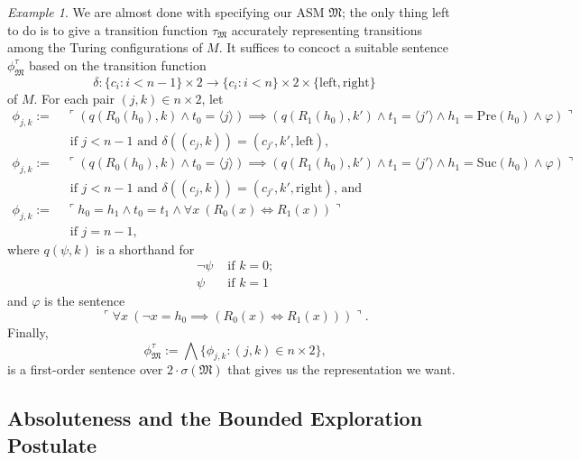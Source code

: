 \documentclass[12pt, twoside]{memoir}
\numberwithin{equation}{section}
\theoremstyle{definition}
\theoremstyle{remark}
\newtheorem{ex}[thm]{Example}
\theoremstyle{definition}
\theoremstyle{definition}
\theoremstyle{definition}
\theoremstyle{remark}
\begin{document}
\begin{ex}
We are almost done with specifying our ASM $\mathfrak{M}$; the only thing left to do is to give a transition function $\tau_{\mathfrak{M}}$ accurately representing transitions among the Turing configurations of $M$. It suffices to concoct a suitable sentence $\phi^{\tau}_{\mathfrak{M}}$ based on the transition function $$\delta : \{c_i : i < n-1\} \times 2 \longrightarrow \{c_i : i < n\} \times 2 \times \{\mathrm{left}, \mathrm{right}\}$$ of $M$. For each pair $(j, k) \in n \times 2$, let
\begin{align*}
    \phi_{j,k} := \ & \ulcorner (q(R_0(h_0), k) \wedge t_0 \! = \! \langle j \rangle) \!\! \implies \!\! (q(R_1(h_0), k') \wedge t_1 \! = \! \langle j' \rangle \wedge h_1 \! = \mathrm{Pre}(h_0) \wedge \varphi) \urcorner \\ 
    & \text{ if } j < n-1 \text{ and } \delta((c_j, k)) = (c_{j'}, k', \mathrm{left}) \text{,} \\
    \phi_{j,k} := \ & \ulcorner (q(R_0(h_0), k) \wedge t_0 \! = \! \langle j \rangle) \!\! \implies \!\! (q(R_1(h_0), k') \wedge t_1 \! = \! \langle j' \rangle \wedge h_1 \! = \mathrm{Suc}(h_0) \wedge \varphi) \urcorner \\ 
    & \text{ if } j < n-1 \text{ and } \delta((c_j, k)) = (c_{j'}, k', \mathrm{right}) \text{, and} \\
    \phi_{j,k} := \ & \ulcorner h_0 = h_1 \wedge t_0 = t_1 \wedge \forall x \ (R_0(x) \iff R_1(x)) \urcorner \\ 
    & \text{ if } j = n-1 \text{,}
\end{align*}
where $q(\psi, k)$ is a shorthand for 
\begin{align*}
    \neg \psi & \text{ if } k = 0 \text{;} \\
    \psi & \text{ if } k = 1
\end{align*}
and $\varphi$ is the sentence
\begin{equation*}
    \ulcorner \forall x \ (\neg x = h_0 \implies (R_0(x) \iff R_1(x))) \urcorner \text{.}
\end{equation*}
Finally, 
\begin{equation*}
    \phi^{\tau}_{\mathfrak{M}} := \bigwedge \{\phi_{j,k} : (j, k) \in n \times 2\} \text{,}
\end{equation*}
is a first-order sentence over $2 \cdot \sigma(\mathfrak{M})$ that gives us the representation we want.
\end{ex}

\subsection{Absoluteness and the Bounded Exploration Postulate}
\end{document}
